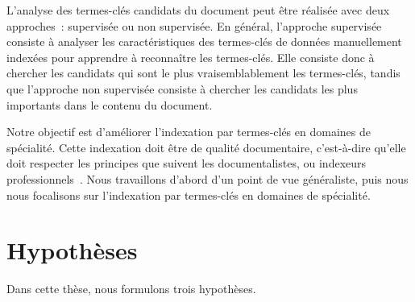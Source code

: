     L'analyse des termes-clés candidats du document peut être réalisée avec deux
    approches~: supervisée ou non supervisée. En général, l'approche supervisée
    consiste à analyser les caractéristiques des termes-clés de données
    manuellement indexées pour apprendre à reconnaître les termes-clés. Elle
    consiste donc à chercher les candidats qui sont le plus vraisemblablement
    les termes-clés, tandis que l'approche non supervisée consiste à chercher
    les candidats les plus importants dans le contenu du document.
    
    Notre objectif est d'améliorer l'indexation par termes-clés en domaines de
    spécialité. Cette indexation doit être de qualité documentaire, c'est-à-dire
    qu'elle doit respecter les principes que suivent les documentalistes, ou
    indexeurs professionnels~\cite{guinchat1996techniquesdocumentaires}. Nous
    travaillons d'abord d'un point de vue généraliste, puis nous nous focalisons
    sur l'indexation par termes-clés en domaines de spécialité.


  \section{Hypothèses}
  \label{sec:main-introduction-hypothesis}
    Dans cette thèse, nous formulons trois hypothèses.

